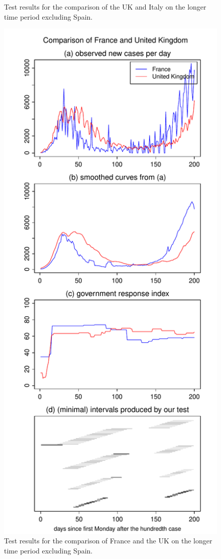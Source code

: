 \documentclass[a4paper,12pt]{article}
\numberwithin{equation}{section}
\begin{document}
{\begin{figure}[h!]
\begin{minipage}[t]{0.49\textwidth}
\caption{Test results for the comparison of the UK and Italy on the longer time period excluding Spain.}
\end{minipage}
\hspace{0.25cm}
\begin{minipage}[t]{0.49\textwidth}
\includegraphics[width=\textwidth]{plots/FRA_vs_GBR_four_countries}
\caption{Test results for the comparison of France and the UK on the longer time period excluding Spain.}\label{fig:supp3:last2}
\end{minipage}
\end{figure}


}
\end{document}
